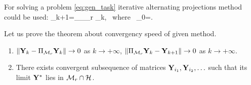 \documentclass[12pt,a4paper,fleqn,leqno]{article}
\begin{document}
For solving a problem \eqref{eq:gen_task} iterative alternating projections method could be used:
\be
   \bfY_{k+1}=\Pi_\calH \Pi_{\calM_r} \bfY_{k}, \mbox{\ where\ } \bfY_{0}=\bfX.
\ee

Let us prove the theorem about convergency speed of given method.

\begin{theorem}
\label{th:converg}
\begin{enumerate}
Let space $\calM_r$ be closed in topology gererated by norm $\|\cdot\|$. Then
\item $\|\mathbf{Y}_k - \Pi_{\mathcal{M}_r}\mathbf{Y}_k\| \to 0$ as $k \to +\infty$, $\|\Pi_{\mathcal{M}_r}\mathbf{Y}_k - \mathbf{Y}_{k+1}\| \to 0$ as $k \to +\infty$.
\item There exists convergent subsequence of matrices $\mathbf{Y}_{i_1}, \mathbf{Y}_{i_2}, \ldots$ such that its limit $\mathbf{Y}^*$ lies in $\mathcal{M}_r \cap \mathcal{H}$.
\end{enumerate}
\end{theorem}
\end{document}
